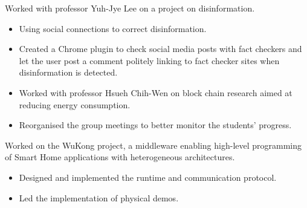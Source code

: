 \documentclass[10pt,a4paper]{../altacv}
\begin{document}
	\medskip
	
	
	
	
	\medskip\medskip{}
	
	Worked with professor Yuh-Jye Lee on a project on disinformation.
	
	\medskip
	
	\begin{itemize}
		\item Using social connections to correct disinformation.
		\item Created a Chrome plugin to check social media posts with fact checkers and let the user post a comment politely linking to fact checker sites when disinformation is detected.
	\end{itemize}
	
	\medskip
	
	
	
	\newpage
	{\marginpar{\vspace*{\dimexpr1pt-\baselineskip}\raggedright}}
	
	\begin{itemize}
		\item Worked with professor Hsueh Chih-Wen on block chain research aimed at reducing energy consumption.
		\item Reorganised the group meetings to better monitor the students' progress.
	\end{itemize}
	
	\medskip
	
	
	
	\medskip\medskip{}
	
	Worked on the WuKong project, a middleware enabling high-level programming of Smart Home applications with heterogeneous architectures.
	
	\begin{itemize}
		\item Designed and implemented the runtime and communication protocol.
		\item Led the implementation of physical demos.
	\end{itemize}
	
\end{document}
